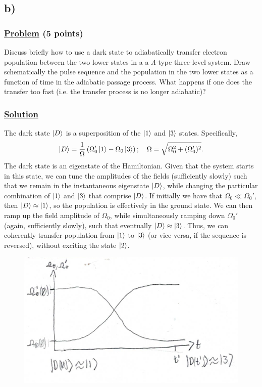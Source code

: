 \documentclass[12pt]{article}
\begin{document}
\subsection*{b)}
\subsubsection*{\underline{Problem} (5 points)}
Discuss briefly how to use a dark state to adiabatically transfer electron population between the two lower states in a a $\Lambda$-type three-level system.
Draw schematically the pulse sequence and the population in the two lower states as a function of time in the adiabatic passage process.
What happens if one does the transfer too fast (i.e. the transfer process is no longer adiabatic)?

\subsubsection*{\underline{Solution}}
The dark state $\ket{D}$ is a superposition of the $\ket{1}$ and $\ket{3}$ states. Specifically,
\[ \ket{D} = \frac{1}{\Omega}\left(\Omega_0'\ket{1} - \Omega_0\ket{3}\right); \quad \Omega = \sqrt{\Omega_0^2 + (\Omega_0')^2}. \]
The dark state is an eigenstate of the Hamiltonian. 
Given that the system starts in this state, we can tune the amplitudes of the fields (sufficiently slowly) such that we remain in the instantaneous eigenstate $\ket{D}$, while changing the particular combination of $\ket{1}$ and $\ket{3}$ that comprise $\ket{D}$.
If initially we have that $\Omega_0 \ll \Omega_0'$, then $\ket{D} \approx \ket{1}$, so the population is effectively in the ground state.
We can then ramp up the field amplitude of $\Omega_0$, while simultaneously ramping down $\Omega_0'$ (again, sufficiently slowly), such that eventually $\ket{D} \approx \ket{3}$.
Thus, we can coherently transfer population from $\ket{1}$ to $\ket{3}$ (or vice-versa, if the sequence is reversed), without exciting the state $\ket{2}$.
\begin{figure}[h!]
    \centering
    \includegraphics{1b.PNG}
\end{figure}
\end{document}
